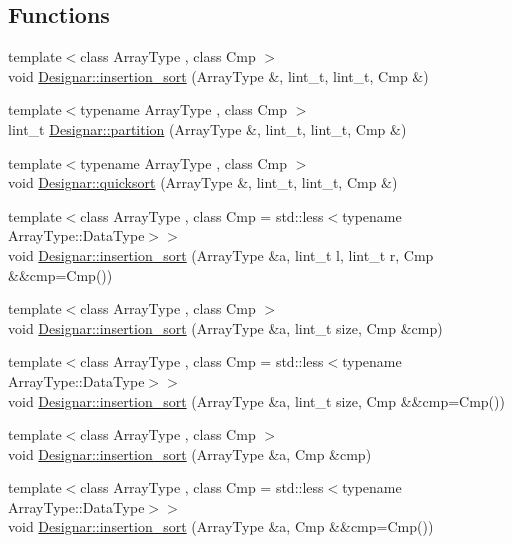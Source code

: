 \subsection*{Functions}
\begin{DoxyCompactItemize}
\item 
{\footnotesize template$<$class Array\+Type , class Cmp $>$ }\\void \hyperlink{namespace_designar_a9fec85a7dda46bb4840bf066c8483853}{Designar\+::insertion\+\_\+sort} (Array\+Type \&, lint\+\_\+t, lint\+\_\+t, Cmp \&)
\item 
{\footnotesize template$<$typename Array\+Type , class Cmp $>$ }\\lint\+\_\+t \hyperlink{namespace_designar_a43b31dd9df26bd0c268d2aa653de6cf0}{Designar\+::partition} (Array\+Type \&, lint\+\_\+t, lint\+\_\+t, Cmp \&)
\item 
{\footnotesize template$<$typename Array\+Type , class Cmp $>$ }\\void \hyperlink{namespace_designar_a2e26fd2dcbb26e5ffc96a960dd4caa94}{Designar\+::quicksort} (Array\+Type \&, lint\+\_\+t, lint\+\_\+t, Cmp \&)
\item 
{\footnotesize template$<$class Array\+Type , class Cmp  = std\+::less$<$typename Array\+Type\+::\+Data\+Type$>$$>$ }\\void \hyperlink{namespace_designar_ab2f897d6db2113316fee5efcd50a459d}{Designar\+::insertion\+\_\+sort} (Array\+Type \&a, lint\+\_\+t l, lint\+\_\+t r, Cmp \&\&cmp=Cmp())
\item 
{\footnotesize template$<$class Array\+Type , class Cmp $>$ }\\void \hyperlink{namespace_designar_a54b704ec22eb8fe7136b1bda64daf3a7}{Designar\+::insertion\+\_\+sort} (Array\+Type \&a, lint\+\_\+t size, Cmp \&cmp)
\item 
{\footnotesize template$<$class Array\+Type , class Cmp  = std\+::less$<$typename Array\+Type\+::\+Data\+Type$>$$>$ }\\void \hyperlink{namespace_designar_a8655d6fa8772dee92565bf7475e5612d}{Designar\+::insertion\+\_\+sort} (Array\+Type \&a, lint\+\_\+t size, Cmp \&\&cmp=Cmp())
\item 
{\footnotesize template$<$class Array\+Type , class Cmp $>$ }\\void \hyperlink{namespace_designar_ab78e23e3c8eb0365e27244f5de2532d2}{Designar\+::insertion\+\_\+sort} (Array\+Type \&a, Cmp \&cmp)
\item 
{\footnotesize template$<$class Array\+Type , class Cmp  = std\+::less$<$typename Array\+Type\+::\+Data\+Type$>$$>$ }\\void \hyperlink{namespace_designar_a93966614af4a5a6c0bd78fe75af5e7cf}{Designar\+::insertion\+\_\+sort} (Array\+Type \&a, Cmp \&\&cmp=Cmp())

\end{DoxyCompactItemize}
